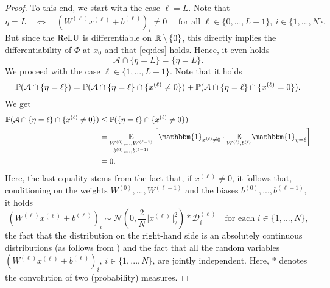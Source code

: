\begin{proof}
To this end, we start with the case $\ell = L$. Note that 
\begin{equation*}
\eta = L \quad \Longleftrightarrow \quad \left(W^{(\ell)}x^{(\ell)} + b^{(\ell)}\right)_i \neq 0 \quad \text{ for all } \ell \in \{0,...,L-1\}, \ i \in \{1,...,N\}.
\end{equation*}
But since the $\operatorname{ReLU}$ is differentiable on $\mathbb{R} \setminus \{0\}$, this directly implies the differentiability of $\Phi$ at $x_0$ and that \eqref{eq:des} holds. 
Hence, it even holds
\begin{equation*}
\mathcal{A} \cap \{\eta = L\} = \{\eta = L\}.
\end{equation*}
We proceed with the case $\ell \in \{1,...,L-1\}$. 
Note that it holds
\begin{equation*}
\mathbb{P} (\mathcal{A} \cap \{\eta = \ell\}) = \mathbb{P} (\mathcal{A} \cap \{\eta = \ell\}\cap \{x^{(\ell)} \neq 0\}) + \mathbb{P} (\mathcal{A} \cap \{\eta = \ell\}\cap \{x^{(\ell)} = 0\}).
\end{equation*}
We get
\begin{align}
\PP (\mathcal{A} \cap \{\eta = \ell\}\cap \{x^{(\ell)} \neq 0\}) &\leq \PP (\{\eta = \ell\}\cap \{x^{(\ell)} \neq 0\}) \nonumber\\
&= \underset{b^{(0)},...,b^{(\ell-1)}}{\underset{W^{(0)},..., W^{(\ell - 1)}}{\EE}} \left[\mathbbm{1}_{x^{(\ell)} \neq 0} \cdot \underset{W^{(\ell)}, b^{(\ell)}}{\EE} \mathbbm{1}_{\eta = \ell} \right]\nonumber\\
\label{eq:zeroset} 
&= 0.
\end{align}
Here, the last equality stems from the fact that, if $x^{(\ell)} \neq 0$, it follows that, conditioning on the weights $W^{(0)}, ..., W^{(\ell -1)}$ and the biases $b^{(0)},..., b^{(\ell - 1)}$, it holds
\begin{equation*}
\left(W^{(\ell)} x^{(\ell)} + b^{(\ell)} \right)_i \sim \mathcal{N}\left(0, \frac{2}{N} \Vert x^{(\ell)} \Vert_2^2\right) \ast \mathcal{D}^{(\ell)}_i \quad \text{for each }i \in \{1,...,N\},
\end{equation*}
the fact that the distribution on the right-hand side is an absolutely continuous distributions (as follows from \cite[Proposition~9.16]{dudley2002real}) and the fact that all the random variables $\left(W^{(\ell)} x^{(\ell)} + b^{(\ell)} \right)_i$, $i \in \{1,...,N\}$, are jointly independent. Here, $\ast$ denotes the convolution of two (probability) measures.


\end{proof}
